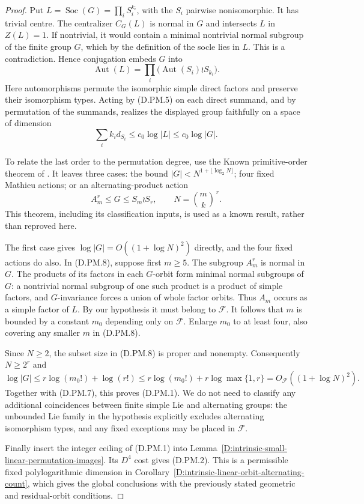 \begin{proof}
Put $L=\operatorname{Soc}(G)=\prod_i S_i^{k_i}$, with the
$S_i$ pairwise nonisomorphic. It has trivial centre.
The centralizer $C_G(L)$ is normal in $G$ and intersects
$L$ in $Z(L)=1$. If nontrivial, it would contain a minimal
nontrivial normal subgroup of the finite group $G$, which
by the definition of the socle lies in $L$. This is a
contradiction. Hence conjugation embeds $G$ into
\[
             \operatorname{Aut}(L)
          =\prod_i\bigl(\operatorname{Aut}(S_i)
                                  \wr S_{k_i}\bigr).     \tag{D.PM.6}
\]
Here automorphisms permute the isomorphic simple direct
factors and preserve their isomorphism types. Acting by
(D.PM.5) on each direct summand, and by permutation of the
summands, realizes the displayed group faithfully on a
space of dimension
\[
             \sum_i k_i d_{S_i}
                \le c_0\log|L|\le c_0\log|G|.             \tag{D.PM.7}
\]

To relate the last order to the permutation degree, use the
Known primitive-order theorem of
\citet[Theorem~1.1; author version p.~2, complete written
proof in Section~2, pp.~4--8]{C_Maroti2002PrimitiveOrders}.
It leaves three cases: the bound
$|G|<N^{1+\lfloor\log_2N\rfloor}$; four fixed Mathieu
actions; or an alternating-product action
\[
      A_m^r\le G\le S_m\wr S_r,\qquad
                         N=\binom{m}{k}^{\,r}.           \tag{D.PM.8}
\]
This theorem, including its classification inputs, is used
as a known result, rather than reproved here.

The first case gives $\log|G|=O((1+\log N)^2)$ directly,
and the four fixed actions do also. In (D.PM.8), suppose
first $m\ge5$. The subgroup $A_m^r$ is normal in $G$.
The products of its factors in each $G$-orbit form minimal
normal subgroups of $G$: a nontrivial normal subgroup of
one such product is a product of simple factors, and
$G$-invariance forces a union of whole factor orbits.
Thus $A_m$ occurs as a simple factor of $L$. By our
hypothesis it must belong to $\mathcal F$. It follows
that $m$ is bounded by a constant $m_0$ depending only
on $\mathcal F$. Enlarge $m_0$ to at least four, also
covering any smaller $m$ in (D.PM.8).

Since $N\ge2$, the subset size in (D.PM.8) is proper
and nonempty. Consequently $N\ge2^r$ and
\[
        \log|G|\le r\log(m_0!)+\log(r!)
             \le r\log(m_0!)+r\log\max\{1,r\}
             =O_{\mathcal F}((1+\log N)^2).               \tag{D.PM.9}
\]
Together with (D.PM.7), this proves (D.PM.1).
We do not need to classify any additional coincidences
between finite simple Lie and alternating groups: the
unbounded Lie family in the hypothesis explicitly
excludes alternating isomorphism types, and any fixed
exceptions may be placed in $\mathcal F$.

Finally insert the integer ceiling of (D.PM.1) into
Lemma~\ref{D:intrinsic-small-linear-permutation-images}.
Its $D^4$ cost gives (D.PM.2). This is a permissible
fixed polylogarithmic dimension in
Corollary~\ref{D:intrinsic-linear-orbit-alternating-count},
which gives the global conclusions with the previously
stated geometric and residual-orbit conditions.
\end{proof}

